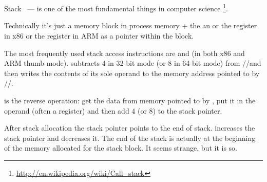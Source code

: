 \section{\Stack}
\label{sec:stack}
\index{\Stack}

{Stack ~--- is one of the most fundamental things in computer science}
\footnote{\url{http://en.wikipedia.org/wiki/Call_stack}}.

{Technically it's just a memory block in process memory + the an \ESP or the \RSP register in x86 or the \SP register in ARM as a pointer within the block.}

{The most frequently used stack access instructions are \PUSH and \POP (in both x86 and ARM thumb-mode). 
\PUSH subtracts $4$ in 32-bit mode (or $8$ in 64-bit mode) from \ESP/\RSP/\SP and then writes the contents of its sole operand to the memory address pointed to by \ESP/\RSP/\SP.} 

{\POP is the reverse operation: get the data from memory pointed to by \SP, 
put it in the operand (often a register) and then add $4$ (or $8$) to the stack pointer.}

{After stack allocation the stack pointer points to the end of stack.}
{\PUSH increases the stack pointer and \POP decreases it.}
{The end of the stack is actually at the beginning of the memory allocated for the stack block. 
It seems strange, but it is so.}

